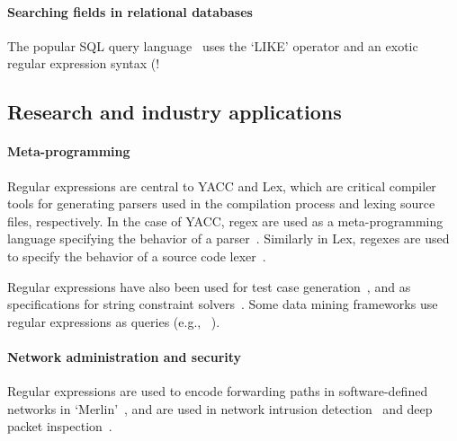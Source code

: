 \paragraph{Searching fields in relational databases}  The popular SQL query language~\cite{Chamberlin:1974:SSE:800296.811515} uses the `LIKE' operator and an exotic regular expression syntax (\fverb!%


\subsection{Research and industry applications}
\paragraph{Meta-programming}  Regular expressions are central to YACC and Lex, which are critical compiler tools for generating parsers used in the compilation process and lexing source files, respectively.  In the case of YACC, regex are used as a meta-programming language specifying the behavior of a parser~\citep{YACCManual}.  Similarly in Lex, regexes are used to specify the behavior of a source code lexer~\citep{LexManual}.

Regular expressions have also been used for test case generation~\cite{Ghosh:2013:JAT:2486788.2486925, Galler:2014:STD:2683035.2683100, Anand:2013:OSM:2503903.2503991, Tillmann:2014:TAT:2642937.2642941},  and as specifications for string constraint solvers~\cite{Trinh:2014:SSS:2660267.2660372, hampi}.  Some data mining frameworks use regular expressions as queries (e.g., ~\cite{Begel:2010:CDE:1806799.1806821}).

\paragraph{Network administration and security} Regular expressions are used to encode forwarding paths in software-defined networks in `Merlin'~\cite{Soule:2014:MLP:2674005.2674989}, and are used in network intrusion detection~\cite{network,Sommer:2003:EBN:948109.948145} and deep packet inspection~\cite{Kumar:2006:AAM:1151659.1159952,Yu:2006:FMR:1185347.1185360}.

